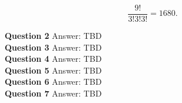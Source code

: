 \documentclass[jou]{apa6}
\begin{document}
$$\frac{9!}{3!3!3!} = 1680.$$

\vspace{6pt}
{\bf Question 2} Answer: TBD\\

\vspace{6pt}
{\bf Question 3} Answer: TBD\\

\vspace{6pt}
{\bf Question 4} Answer: TBD\\

\vspace{6pt}
{\bf Question 5} Answer: TBD\\

\vspace{6pt}
{\bf Question 6} Answer: TBD\\

\vspace{6pt}
{\bf Question 7} Answer: TBD\\
\end{document}
